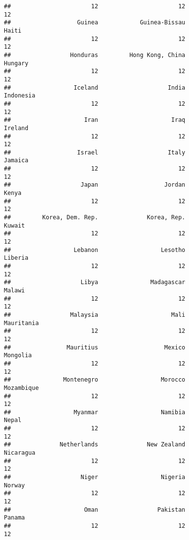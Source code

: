 \documentclass[
]{book}
\begin{document}
\begin{verbatim}
##                       12                       12                       12 
##                   Guinea            Guinea-Bissau                    Haiti 
##                       12                       12                       12 
##                 Honduras         Hong Kong, China                  Hungary 
##                       12                       12                       12 
##                  Iceland                    India                Indonesia 
##                       12                       12                       12 
##                     Iran                     Iraq                  Ireland 
##                       12                       12                       12 
##                   Israel                    Italy                  Jamaica 
##                       12                       12                       12 
##                    Japan                   Jordan                    Kenya 
##                       12                       12                       12 
##         Korea, Dem. Rep.              Korea, Rep.                   Kuwait 
##                       12                       12                       12 
##                  Lebanon                  Lesotho                  Liberia 
##                       12                       12                       12 
##                    Libya               Madagascar                   Malawi 
##                       12                       12                       12 
##                 Malaysia                     Mali               Mauritania 
##                       12                       12                       12 
##                Mauritius                   Mexico                 Mongolia 
##                       12                       12                       12 
##               Montenegro                  Morocco               Mozambique 
##                       12                       12                       12 
##                  Myanmar                  Namibia                    Nepal 
##                       12                       12                       12 
##              Netherlands              New Zealand                Nicaragua 
##                       12                       12                       12 
##                    Niger                  Nigeria                   Norway 
##                       12                       12                       12 
##                     Oman                 Pakistan                   Panama 
##                       12                       12                       12 

\end{verbatim}
\end{document}
